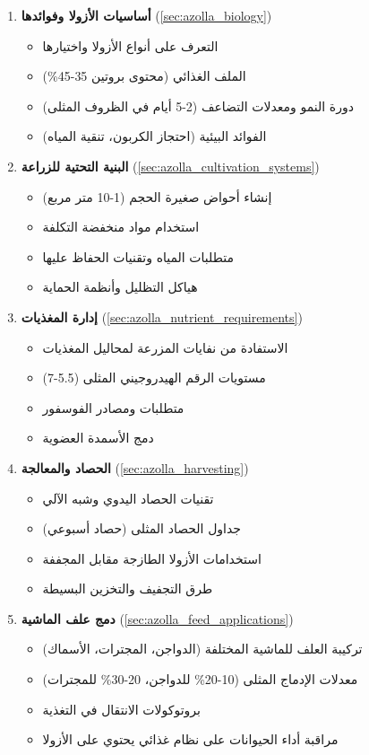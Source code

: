 \begin{enumerate}
    \item \textbf{أساسيات الأزولا وفوائدها} (\ref{sec:azolla_biology})
    \begin{itemize}
        \item التعرف على أنواع الأزولا واختيارها
        \item الملف الغذائي (محتوى بروتين 35-45\%)
        \item دورة النمو ومعدلات التضاعف (2-5 أيام في الظروف المثلى)
        \item الفوائد البيئية (احتجاز الكربون، تنقية المياه)
    \end{itemize}
    
    \item \textbf{البنية التحتية للزراعة} (\ref{sec:azolla_cultivation_systems})
    \begin{itemize}
        \item إنشاء أحواض صغيرة الحجم (1-10 متر مربع)
        \item استخدام مواد منخفضة التكلفة
        \item متطلبات المياه وتقنيات الحفاظ عليها
        \item هياكل التظليل وأنظمة الحماية
    \end{itemize}
    
    \item \textbf{إدارة المغذيات} (\ref{sec:azolla_nutrient_requirements})
    \begin{itemize}
        \item الاستفادة من نفايات المزرعة لمحاليل المغذيات
        \item مستويات الرقم الهيدروجيني المثلى (5.5-7)
        \item متطلبات ومصادر الفوسفور
        \item دمج الأسمدة العضوية
    \end{itemize}
    
    \item \textbf{الحصاد والمعالجة} (\ref{sec:azolla_harvesting})
    \begin{itemize}
        \item تقنيات الحصاد اليدوي وشبه الآلي
        \item جداول الحصاد المثلى (حصاد أسبوعي)
        \item استخدامات الأزولا الطازجة مقابل المجففة
        \item طرق التجفيف والتخزين البسيطة
    \end{itemize}
    
    \item \textbf{دمج علف الماشية} (\ref{sec:azolla_feed_applications})
    \begin{itemize}
        \item تركيبة العلف للماشية المختلفة (الدواجن، المجترات، الأسماك)
        \item معدلات الإدماج المثلى (10-20\% للدواجن، 20-30\% للمجترات)
        \item بروتوكولات الانتقال في التغذية
        \item مراقبة أداء الحيوانات على نظام غذائي يحتوي على الأزولا
    \end{itemize}
    

\end{enumerate}
